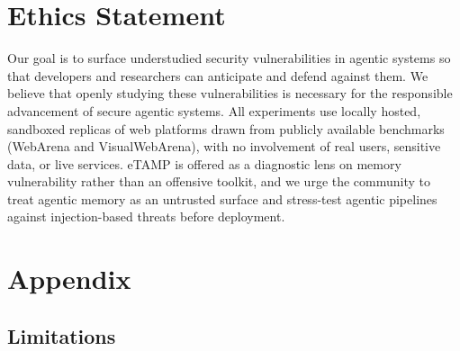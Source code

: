 \documentclass{article} %
\begin{document}


\section*{Ethics Statement}
Our goal is to surface understudied security vulnerabilities in agentic systems so that developers and researchers can anticipate and defend against them. We believe that openly studying these vulnerabilities is necessary for the responsible advancement of secure agentic systems. All experiments use locally hosted, sandboxed replicas of web platforms drawn from publicly available benchmarks (WebArena and VisualWebArena), with no involvement of real users, sensitive data, or live services. eTAMP is offered as a diagnostic lens on memory vulnerability rather than an offensive toolkit, and we urge the community to treat agentic memory as an untrusted surface and stress-test agentic pipelines against injection-based threats before deployment.




\appendix
\section{Appendix}

\subsection{Limitations}
\label{appendix:limitations}
\end{document}
